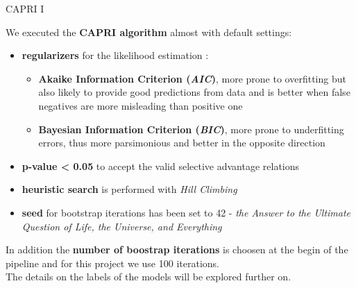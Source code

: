 \documentclass{beamer}
\begin{document}
\begin{frame}{CAPRI I}
  \begin{block}{}
    \small
    We executed the \textbf{CAPRI algorithm} \cite{capri} almost with default
    settings:
    \begin{itemize}
      \item \textbf{regularizers} for the likelihood estimation \cite{picnic}:
      \begin{itemize}
        \item \textbf{Akaike Information Criterion (\textit{AIC})}, more prone
        to overfitting but also likely to provide good predictions from data and
        is better when false negatives are more misleading than positive one 
        \item \textbf{Bayesian Information Criterion (\textit{BIC})}, more prone
        to underfitting errors, thus more parsimonious and better in the
        opposite direction 
      \end{itemize}
      \item \textbf{p-value < 0.05} to accept the valid selective advantage relations
      \item \textbf{heuristic search} is performed with \textit{Hill Climbing}
      \item \textbf{seed} for bootstrap iterations has been set to 42 -
      \textit{the Answer to the Ultimate Question of Life, the Universe, and
        Everything} 
    \end{itemize}
    In addition the \textbf{number of boostrap iterations} is choosen at the
    begin of the pipeline and for this project we use 100 iterations.\\ 
    The details on the labels of the models will be explored further on.
  \end{block}
\end{frame}
\end{document}
